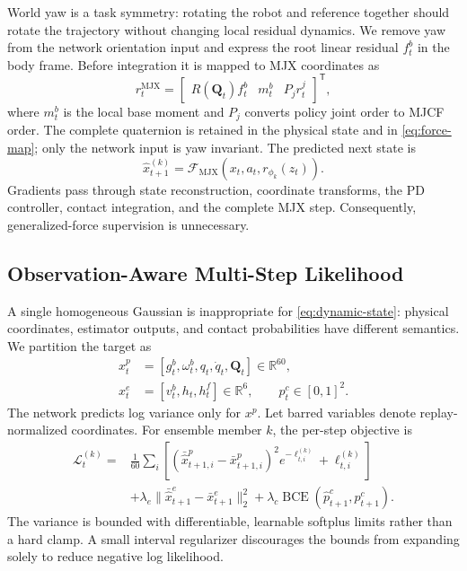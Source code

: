 \documentclass[10pt,twocolumn]{article}
\newcommand{\R}{\mathbb{R}}
\newcommand{\cL}{\mathcal{L}}
\newcommand{\cF}{\mathcal{F}}
\newcommand{\quat}{\bm{Q}}
\newcommand{\trans}{^{\mathsf T}}
\begin{document}
World yaw is a task symmetry: rotating the robot and reference together should rotate the trajectory without changing local residual dynamics. We remove yaw from the network orientation input and express the root linear residual $f_t^b$ in the body frame. Before integration it is mapped to MJX coordinates as
\begin{equation}
r_t^{\mathrm{MJX}}=
\begin{bmatrix}
R(\quat_t)f_t^b & m_t^b & P_j r_t^j
\end{bmatrix}\trans,
\label{eq:force-map}
\end{equation}
where $m_t^b$ is the local base moment and $P_j$ converts policy joint order to MJCF order. The complete quaternion is retained in the physical state and in \cref{eq:force-map}; only the network input is yaw invariant. The predicted next state is
\begin{equation}
\hat x_{t+1}^{(k)}=\cF_{\mathrm{MJX}}(x_t,a_t,r_{\phi_k}(z_t)).
\label{eq:transition}
\end{equation}
Gradients pass through state reconstruction, coordinate transforms, the PD controller, contact integration, and the complete MJX step. Consequently, generalized-force supervision is unnecessary.

\subsection{Observation-Aware Multi-Step Likelihood}
\label{sec:loss}

A single homogeneous Gaussian is inappropriate for \cref{eq:dynamic-state}: physical coordinates, estimator outputs, and contact probabilities have different semantics. We partition the target as
\begin{align}
x_t^p&=[g_t^b,\omega_t^b,q_t,\dot q_t,\quat_t]\in\R^{60},\\
x_t^e&=[v_t^b,h_t,h_t^f]\in\R^6,\qquad p_t^c\in[0,1]^2.
\end{align}
The network predicts log variance only for $x^p$. Let barred variables denote replay-normalized coordinates. For ensemble member $k$, the per-step objective is
\begin{align}
\cL_t^{(k)}={}&\frac{1}{60}\sum_i
\left[(\bar{\hat x}_{t+1,i}^p-\bar x_{t+1,i}^p)^2e^{-\ell_{t,i}^{(k)}}+\ell_{t,i}^{(k)}\right]\nonumber\\
&+\lambda_e\|\bar{\hat x}_{t+1}^e-\bar x_{t+1}^e\|_2^2
+\lambda_c\operatorname{BCE}(\hat p_{t+1}^c,p_{t+1}^c).
\label{eq:hybrid-loss}
\end{align}
The variance is bounded with differentiable, learnable softplus limits rather than a hard clamp. A small interval regularizer discourages the bounds from expanding solely to reduce negative log likelihood.
\end{document}
